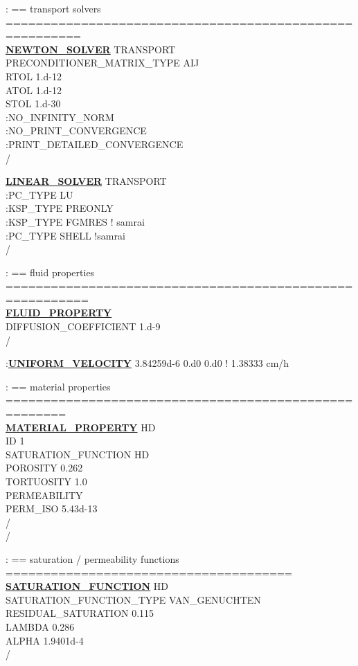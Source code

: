 \noindent
: == transport solvers ========================================================\\
\hyperlink{target_newt}{\bf NEWTON\_SOLVER} TRANSPORT\\
PRECONDITIONER\_MATRIX\_TYPE AIJ\\
RTOL 1.d-12\\
ATOL 1.d-12\\
STOL 1.d-30\\
:NO\_INFINITY\_NORM\\
:NO\_PRINT\_CONVERGENCE\\
:PRINT\_DETAILED\_CONVERGENCE\\
/

\noindent
\hyperlink{target_linsolv}{\bf LINEAR\_SOLVER} TRANSPORT\\
:PC\_TYPE LU\\
:KSP\_TYPE PREONLY\\
:KSP\_TYPE FGMRES ! samrai\\
:PC\_TYPE SHELL !samrai\\
/

\noindent
: == fluid properties =========================================================\\
\hyperlink{target_fluid_property}{\bf FLUID\_PROPERTY}\\
DIFFUSION\_COEFFICIENT 1.d-9\\
/

\noindent
:\hyperlink{target_unifvel}{\bf UNIFORM\_VELOCITY} 3.84259d-6 0.d0 0.d0  ! 1.38333 cm/h

\noindent
: == material properties ======================================================\\
\hyperlink{target_mat}{\bf MATERIAL\_PROPERTY} HD\\
ID 1\\
SATURATION\_FUNCTION HD\\
POROSITY 0.262\\
TORTUOSITY 1.0\\
PERMEABILITY\\
PERM\_ISO 5.43d-13\\
/\\
/

\noindent
: == saturation / permeability functions ======================================\\
\hyperlink{target_sat}{\bf SATURATION\_FUNCTION} HD\\
SATURATION\_FUNCTION\_TYPE VAN\_GENUCHTEN\\
RESIDUAL\_SATURATION 0.115\\
LAMBDA 0.286\\
ALPHA 1.9401d-4\\
/

